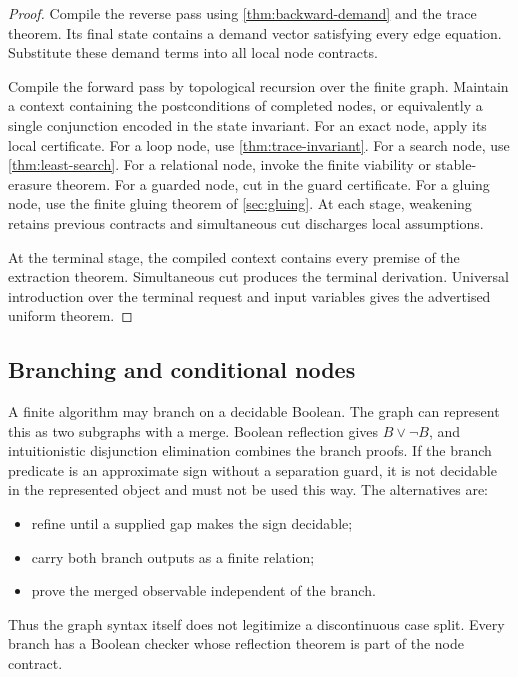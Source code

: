 \begin{proof}
Compile the reverse pass using \cref{thm:backward-demand} and the trace theorem.  Its final state contains a demand vector satisfying every edge equation.  Substitute these demand terms into all local node contracts.

Compile the forward pass by topological recursion over the finite graph.  Maintain a context containing the postconditions of completed nodes, or equivalently a single conjunction encoded in the state invariant.  For an exact node, apply its local certificate.  For a loop node, use \cref{thm:trace-invariant}.  For a search node, use \cref{thm:least-search}.  For a relational node, invoke the finite viability or stable-erasure theorem.  For a guarded node, cut in the guard certificate.  For a gluing node, use the finite gluing theorem of \cref{sec:gluing}.  At each stage, weakening retains previous contracts and simultaneous cut discharges local assumptions.

At the terminal stage, the compiled context contains every premise of the extraction theorem.  Simultaneous cut produces the terminal derivation.  Universal introduction over the terminal request and input variables gives the advertised uniform theorem.
\end{proof}

\subsection{Branching and conditional nodes}

A finite algorithm may branch on a decidable Boolean.  The graph can represent this as two subgraphs with a merge.  Boolean reflection gives \(B\vee\neg B\), and intuitionistic disjunction elimination combines the branch proofs.  If the branch predicate is an approximate sign without a separation guard, it is not decidable in the represented object and must not be used this way.  The alternatives are:

\begin{itemize}
\item refine until a supplied gap makes the sign decidable;
\item carry both branch outputs as a finite relation;
\item prove the merged observable independent of the branch.
\end{itemize}

Thus the graph syntax itself does not legitimize a discontinuous case split.  Every branch has a Boolean checker whose reflection theorem is part of the node contract.

